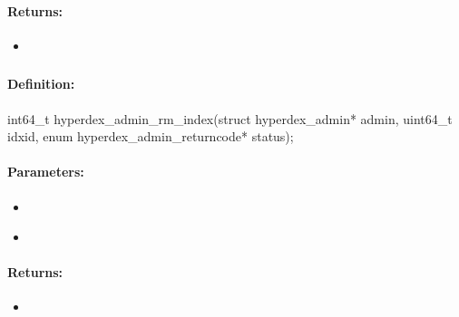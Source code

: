 \paragraph{Returns:}
\begin{itemize}[noitemsep]
\item {}\\

\end{itemize}

\pagebreak
\subsubsection{}
\label{api:c:rm_index}


\paragraph{Definition:}
\begin{ccode}
int64_t hyperdex_admin_rm_index(struct hyperdex_admin* admin,
        uint64_t idxid,
        enum hyperdex_admin_returncode* status);
\end{ccode}

\paragraph{Parameters:}
\begin{itemize}[noitemsep]
\item {}\\

\item {}\\

\end{itemize}

\paragraph{Returns:}
\begin{itemize}[noitemsep]
\item {}\\

\end{itemize}

